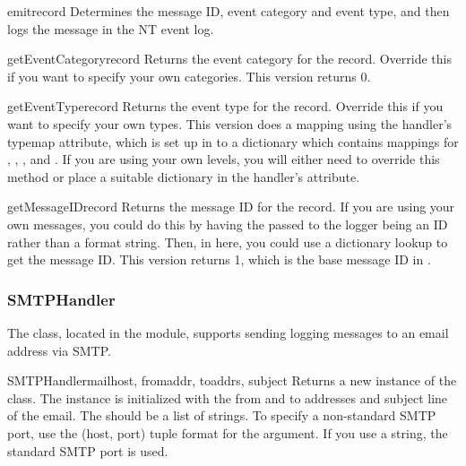 \begin{methoddesc}{emit}{record}
Determines the message ID, event category and event type, and then logs the
message in the NT event log.
\end{methoddesc}

\begin{methoddesc}{getEventCategory}{record}
Returns the event category for the record. Override this if you
want to specify your own categories. This version returns 0.
\end{methoddesc}

\begin{methoddesc}{getEventType}{record}
Returns the event type for the record. Override this if you want
to specify your own types. This version does a mapping using the
handler's typemap attribute, which is set up in 
to a dictionary which contains mappings for ,
, ,  and
. If you are using your own levels, you will either need
to override this method or place a suitable dictionary in the
handler's  attribute.
\end{methoddesc}

\begin{methoddesc}{getMessageID}{record}
Returns the message ID for the record. If you are using your
own messages, you could do this by having the  passed to the
logger being an ID rather than a format string. Then, in here,
you could use a dictionary lookup to get the message ID. This
version returns 1, which is the base message ID in
.
\end{methoddesc}

\subsubsection{SMTPHandler}

The  class, located in the
 module, supports sending logging messages to
an email address via SMTP.

\begin{classdesc}{SMTPHandler}{mailhost, fromaddr, toaddrs, subject}
Returns a new instance of the  class. The
instance is initialized with the from and to addresses and subject
line of the email. The  should be a list of strings. To specify a
non-standard SMTP port, use the (host, port) tuple format for the
 argument. If you use a string, the standard SMTP port
is used.
\end{classdesc}

